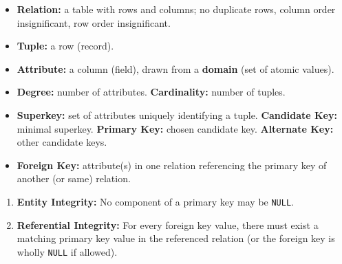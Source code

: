 \documentclass[11pt]{article}
\begin{document}
\begin{definition}
\begin{itemize}
\item \textbf{Relation:} a table with rows and columns; no duplicate rows, column order insignificant, row order insignificant.
\item \textbf{Tuple:} a row (record).
\item \textbf{Attribute:} a column (field), drawn from a \textbf{domain} (set of atomic values).
\item \textbf{Degree:} number of attributes. \textbf{Cardinality:} number of tuples.
\item \textbf{Superkey:} set of attributes uniquely identifying a tuple. \textbf{Candidate Key:} minimal superkey. \textbf{Primary Key:} chosen candidate key. \textbf{Alternate Key:} other candidate keys.
\item \textbf{Foreign Key:} attribute(s) in one relation referencing the primary key of another (or same) relation.
\end{itemize}
\end{definition}

\begin{propriete}
\begin{enumerate}
\item \textbf{Entity Integrity:} No component of a primary key may be \texttt{NULL}.
\item \textbf{Referential Integrity:} For every foreign key value, there must exist a matching primary key value in the referenced relation (or the foreign key is wholly \texttt{NULL} if allowed).
\end{enumerate}
\end{propriete}
\end{document}
